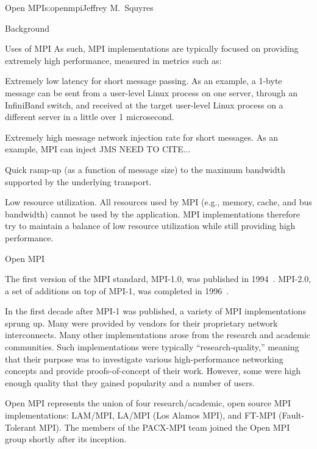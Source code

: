 \begin{aosachapter}{Open MPI}{s:openmpi}{Jeffrey M.\ Squyres}
\begin{aosasect1}{Background}
\begin{aosasect2}{Uses of MPI}
As such, MPI implementations are typically focused on providing
extremely high performance, measured in metrics such as:

\begin{aosaitemize}
\item Extremely low latency for short message passing.  As an example,
  a 1-byte message can be sent from a user-level Linux process on one
  server, through an InfiniBand switch, and received at the target
  user-level Linux process on a different server in a little over 1
  microsecond.
\item Extremely high message network injection rate for short
  messages.  As an example, MPI can inject JMS NEED TO CITE...
\item Quick ramp-up (as a function of message size) to the maximum
  bandwidth supported by the underlying transport.
\item Low resource utilization.  All resources used by MPI (e.g.,
  memory, cache, and bus bandwidth) cannot be used by the application.
  MPI implementations therefore try to maintain a balance of low
  resource utilization while still providing high performance.
\end{aosaitemize}

\end{aosasect2}


\begin{aosasect2}{Open MPI}

The first version of the MPI standard, MPI-1.0, was published in
1994~\cite{mpi_forum93:_mpi}.  
%
MPI-2.0, a set of additions on top of MPI-1, was completed in
1996~\cite{geist96:_mpi2_lyon}.

In the first decade after MPI-1 was published, a variety of MPI
implementations sprung up.  Many were provided by vendors for their
proprietary network interconnects.  Many other implementations arose
from the research and academic communities.  Such implementations were
typically ``research-quality,'' meaning that their purpose was to
investigate various high-performance networking concepts and provide
proofs-of-concept of their work.  However, some were high enough
quality that they gained popularity and a number of users.

Open MPI represents the union of four research/academic, open source
MPI implementations: LAM/MPI, LA/MPI (Los Alamos MPI), and FT-MPI
(Fault-Tolerant MPI).
%
The members of the PACX-MPI team joined the Open MPI group shortly
after its inception.


\end{aosasect2}
\end{aosasect1}
\end{aosachapter}
